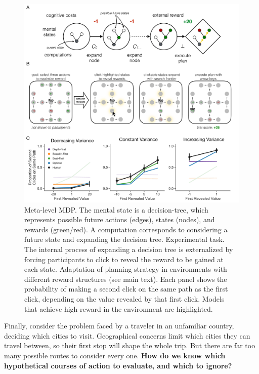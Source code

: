 \documentclass[dsingle]{memo}
\begin{document}
\begin{figure}[ph]
  \centering
  \includegraphics[width=\textwidth]{diagrams/precis/planning.pdf}
  \caption{
     Meta-level MDP. The mental state is a decision-tree, which represents possible future actions (edges), states (nodes), and rewards (green/red). A computation corresponds to considering a future state and expanding the decision tree.
     Experimental task. The internal process of expanding a decision tree is externalized by forcing participants to click to reveal the reward to be gained at each state.
     Adaptation of planning strategy in environments with different reward structures (see main text). Each panel shows the probability of making a second click on the same path as the first click, depending on the value revealed by that first click. Models that achieve high reward in the environment are highlighted. %
  }
  \label{fig:planning}
\end{figure}


Finally, consider the problem faced by a traveler in an unfamiliar country, deciding which cities to visit. Geographical concerns limit which cities they can travel between, so their first stop will shape the whole trip. But there are far too many possible routes to consider every one. \textbf{How do we know which hypothetical courses of action to evaluate, and which to ignore?}
\end{document}
